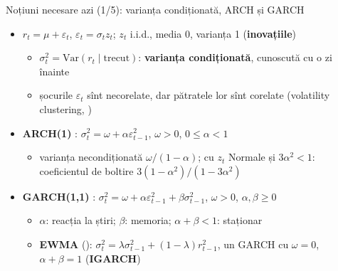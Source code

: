 \begin{frame}{Noțiuni necesare azi (1/5): varianța condiționată, ARCH și GARCH}
\itemsize{\small}
\begin{itemize}
    \item $r_t = \mu + \varepsilon_t$, $\varepsilon_t = \sigma_t z_t$; $z_t$ i.i.d., media 0, varianța 1 (\textbf{inovațiile})
    \begin{itemize}
        \item $\sigma_t^2 = \mathrm{Var}(r_t \mid \text{trecut})$: \textbf{varianța condiționată}, cunoscută cu o zi înainte
        \item șocurile $\varepsilon_t$ sînt necorelate, dar pătratele lor sînt corelate (volatility clustering, )
    \end{itemize}
    \item \textbf{ARCH(1)} : $\sigma_t^2 = \omega + \alpha\varepsilon_{t-1}^2$, $\omega > 0$, $0 \le \alpha < 1$
    \begin{itemize}
        \item varianța necondiționată $\omega/(1 - \alpha)$; cu $z_t$ Normale și $3\alpha^2 < 1$: coeficientul de boltire $3(1 - \alpha^2)/(1 - 3\alpha^2)$
    \end{itemize}
    \item \textbf{GARCH(1,1)} : $\sigma_t^2 = \omega + \alpha\varepsilon_{t-1}^2 + \beta\sigma_{t-1}^2$, $\omega > 0$, $\alpha, \beta \ge 0$
    \begin{itemize}
        \item $\alpha$: reacția la știri; $\beta$: memoria; $\alpha + \beta < 1$: staționar
        \item \textbf{EWMA} (): $\sigma_t^2 = \lambda\sigma_{t-1}^2 + (1 - \lambda)r_{t-1}^2$, un GARCH cu $\omega = 0$, $\alpha + \beta = 1$ (\textbf{IGARCH})
    \end{itemize}
\end{itemize}
\end{frame}

